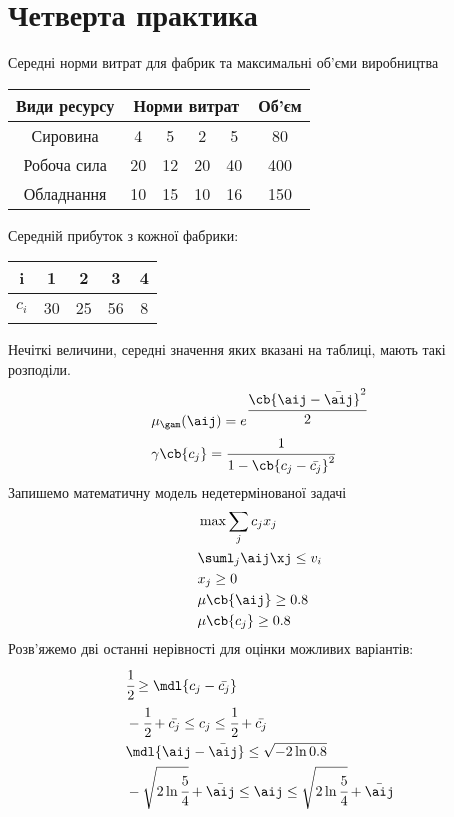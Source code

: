 \section{Четверта практика}
\begin{tsk}
Середні норми витрат для фабрик та максимальні об’єми виробництва
\begin{center}
\begin{tabular}{|c|cccc|c|}
\hline
Види ресурсу & \multicolumn{4}{|c|}{Норми витрат} & Об’єм\\
\hline
Сировина & 4 & 5 & 2 & 5  & 80 \\
Робоча сила & 20 & 12 & 20 &40 & 400 \\
Обладнання & 10 & 15 & 10 & 16 & 150 \\
\hline
\end{tabular}
\end{center}
Середній прибуток з кожної фабрики:
\begin{center}
\begin{tabular}{|c|c|c|c|c|}
\hline
i & 1 & 2 & 3 & 4 \\
\hline
$c_i$ & 30 & 25 & 56 & 8 \\
\hline
\end{tabular}
\end{center}
Нечіткі величини, середні значення яких вказані на таблиці, мають такі розподіли.
\begin{eqnarray}
&\mu_\gam(\aij) = e^{\cfrac{\cb{\aij - \bar{\aij}}^2}{2}}\\
&\gamma\cb{c_j} = \cfrac 1{1 - \cb{c_j-\bar{c_j}}^2}
\end{eqnarray}
Запишемо математичну модель недетермінованої задачі
\begin{eqnarray}
&\max\sum_{j} c_jx_j\\
&\suml_{j} \aij\xj \leq v_i\\
&x_j\geq 0\\
&\mu\cb{\aij} \geq 0.8\\
&\mu\cb{c_j} \geq 0.8\\
\end{eqnarray}
Розв’яжемо дві останні нерівності для оцінки можливих варіантів:
\begin{eqnarray}
&\cfrac12 \geq \mdl{c_j - \bar{c_j}} \\
&-\cfrac12 + \bar {c_j} \leq c_j \leq \cfrac12 + \bar{c_j}\\
&\mdl{\aij - \bar{\aij}} \leq \sqrt{-2\ln 0.8} \\
&-\sqrt{2\ln\cfrac54} + \bar{\aij} \leq \aij \leq \sqrt{2\ln\cfrac54} + \bar{\aij}

\end{eqnarray}
\end{tsk}
